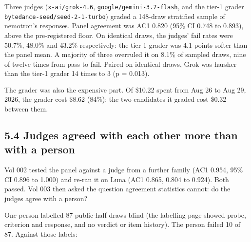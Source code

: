 \documentclass[
  11pt,
]{article}
\begin{document}
Three judges (\texttt{x-ai/grok-4.6}, \texttt{google/gemini-3.7-flash},
and the tier-1 grader \texttt{bytedance-seed/seed-2-1-turbo}) graded a
148-draw stratified sample of nemotron's responses. Panel agreement was
AC1 0.820 (95\% CI 0.748 to 0.893), above the pre-registered floor. On
identical draws, the judges' fail rates were 50.7\%, 48.0\% and 43.2\%
respectively: the tier-1 grader was 4.1 points softer than the panel
mean. A majority of three overruled it on 8.1\% of sampled draws, nine
of twelve times from pass to fail. Paired on identical draws, Grok was
harsher than the tier-1 grader 14 times to 3 (p = 0.013).

The grader was also the expensive part. Of \$10.22 spent from Aug 26 to
Aug 29, 2026, the grader cost \$8.62 (84\%); the two candidates it
graded cost \$0.32 between them.

\hypertarget{judges-agreed-with-each-other-more-than-with-a-person}{%
\subsection{5.4 Judges agreed with each other more than with a
person}\label{judges-agreed-with-each-other-more-than-with-a-person}}

Vol 002 tested the panel against a judge from a further family (AC1
0.954, 95\% CI 0.896 to 1.000) and re-ran it on Luna (AC1 0.865, 0.804
to 0.924). Both passed. Vol 003 then asked the question agreement
statistics cannot: do the judges agree with a person?

One person labelled 87 public-half draws blind (the labelling page
showed probe, criterion and response, and no verdict or item history).
The person failed 10 of 87. Against those labels:
\end{document}
